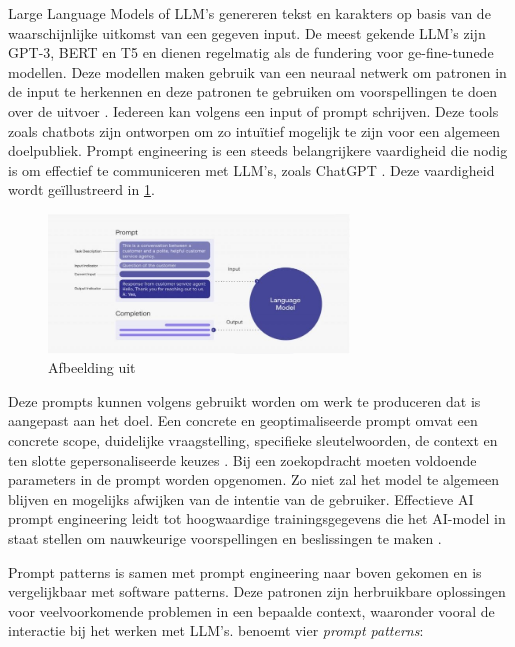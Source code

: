 Large Language Models of LLM's genereren tekst en karakters op basis van de waarschijnlijke uitkomst van een gegeven input. De meest gekende LLM's zijn GPT-3, BERT en T5 en dienen regelmatig als de fundering voor ge-fine-tunede modellen. Deze modellen maken gebruik van een neuraal netwerk om patronen in de input te herkennen en deze patronen te gebruiken om voorspellingen te doen over de uitvoer \autocite{Liu2020}. Iedereen kan volgens \textcite{McFarland2023} een input of prompt schrijven. Deze tools zoals chatbots zijn ontworpen om zo intuïtief mogelijk te zijn voor een algemeen doelpubliek. Prompt engineering is een steeds belangrijkere vaardigheid die nodig is om effectief te communiceren met LLM’s, zoals ChatGPT \autocite{Harwell2023}. Deze vaardigheid wordt geïllustreerd in \ref{img:prompt-engineering}.

\begin{figure}[H]
	\begin{center}
		\includegraphics[width=8cm]{img/prompt-engineering-medium.png}
	\end{center}
	\caption{Afbeelding uit \textcite{McFarland2023}}
	\label{img:prompt-engineering}
\end{figure}

Deze prompts kunnen volgens \textcite{Liu2020} gebruikt worden om werk te produceren dat is aangepast aan het doel. Een concrete en geoptimaliseerde prompt omvat een concrete scope, duidelijke vraagstelling, specifieke sleutelwoorden, de context en ten slotte gepersonaliseerde keuzes \autocite{McFarland2023}. Bij een zoekopdracht moeten voldoende parameters in de prompt worden opgenomen. Zo niet zal het model te algemeen blijven en mogelijks afwijken van de intentie van de gebruiker. Effectieve AI prompt engineering leidt tot hoogwaardige trainingsgegevens die het AI-model in staat stellen om nauwkeurige voorspellingen en beslissingen te maken \autocite{Liu2020}. 

\medspace

Prompt patterns is samen met prompt engineering naar boven gekomen en is vergelijkbaar met software patterns. Deze patronen zijn herbruikbare oplossingen voor veelvoorkomende problemen in een bepaalde context, waaronder vooral de interactie bij het werken met LLM's. \textcite{White2023} benoemt vier \textit{prompt patterns}:

